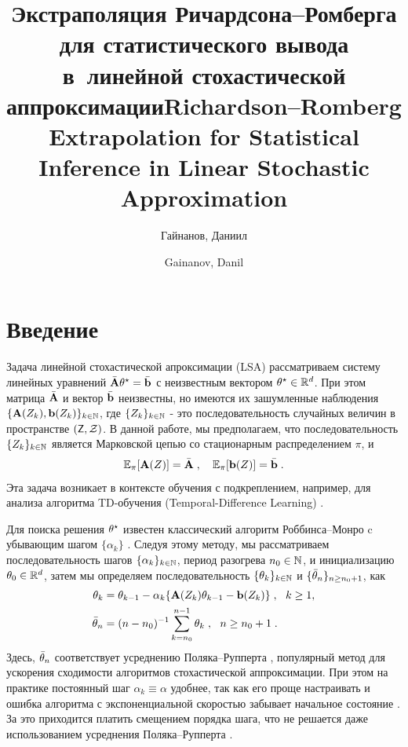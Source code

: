 \documentclass[blind]{psta}
\title[RR-экстраполяция в линейной стохастической аппроксимации]
{Экстраполяция Ричардсона--Ромберга для статистического вывода
в~линейной стохастической аппроксимации}
\author{Гайнанов, {Д}аниил \NoMiddleName}
\title[RR extrapolation in linear stochastic approximation]
{Richardson--Romberg Extrapolation for Statistical Inference
in Linear Stochastic Approximation}
\author{Gainanov, Danil \NoMiddleName}
\begin{document}
\Russian
\maketitle

\section*{Введение}

Задача линейной стохастической апроксимации (LSA) рассматриваем систему линейных уравнений $\bar{\mathbf{A}} \theta^\star = \bar{\mathbf{b}}$ с неизвестным вектором $\theta^\star \in \mathbb{R}^d$. При этом матрица $\bar{\mathbf{A}}$ и вектор $\bar{\mathbf{b}}$ неизвестны, но имеются их зашумленные наблюдения $\{\mathbf{A}(Z_k), \mathbf{b}(Z_k)\}_{k\in \mathbb{N}}$, где $\{Z_k\}_{k \in \mathbb{N}}$ - это последовательность случайных величин в пространстве $(\mathsf{Z}, \mathcal{Z})$. В данной работе, мы предполагаем, что последовательность $\{Z_k\}_{k\in \mathbb{N}}$ является Марковской цепью со стационарным распределением $\pi$, и
\begin{align*}
    \mathbb{E}_\pi[\mathbf{A}(Z)] = \bar{\mathbf{A}} \;, \quad \mathbb{E}_\pi[\mathbf{b}(Z)] = \bar{\mathbf{b}} \;.
\end{align*}
Эта задача возникает в контексте обучения с подкреплением, например, для анализа алгоритма TD-обучения (Temporal-Difference Learning) \cite{sutton:book:2018}.

Для поиска решения $\theta^\star$ известен классический алгоритм Роббинса--Монро c убывающим шагом $\{\alpha_k\}$
\cite{RobbinsMonro1951}. Следуя этому методу, мы рассматриваем последовательность шагов $\{\alpha_k\}_{k \in \mathbb{N}}$, период разогрева $n_0 \in \mathbb{N}$, и инициализацию $\theta_0 \in \mathbb{R}^{d}$, затем мы определяем последовательность $\{\theta_{k} \}_{k \in \mathbb{N}}$ и $\{ \bar{\theta}_{n} \}_{n \geq n_0+1}$, как
\begin{equation}
\label{eq:lsa-decreasing}
\begin{split}
\textstyle \theta_{k} &= \theta_{k-1} - \alpha_k \{ \mathbf{A}(Z_k) \theta_{k-1} - \mathbf{b}(Z_k) \} \;,~~ k \geq 1, \\
\textstyle \bar{\theta}_{n} &= (n-n_0)^{-1} \sum_{k=n_0}^{n-1} \theta_{k} \;, ~~n \geq n_0+1 \;.
\end{split}
\end{equation}
Здесь, $\bar{\theta}_{n}$ соответствует усреднению Поляка--Рупперта \cite{ruppert1988efficient,PolyakJuditsky1992}, популярный метод для ускорения сходимости алгоритмов стохастической аппроксимации. При этом на практике постоянный шаг $\alpha_k \equiv \alpha$ удобнее, так как его проще настраивать и ошибка алгоритма с экспоненциальной скоростью забывает начальное состояние \cite{Dieuleveut2020}. За это приходится платить смещением порядка шага, что не решается даже использованием усреднения Поляка--Рупперта \cite{Polyak1990,PolyakJuditsky1992}.
\end{document}
